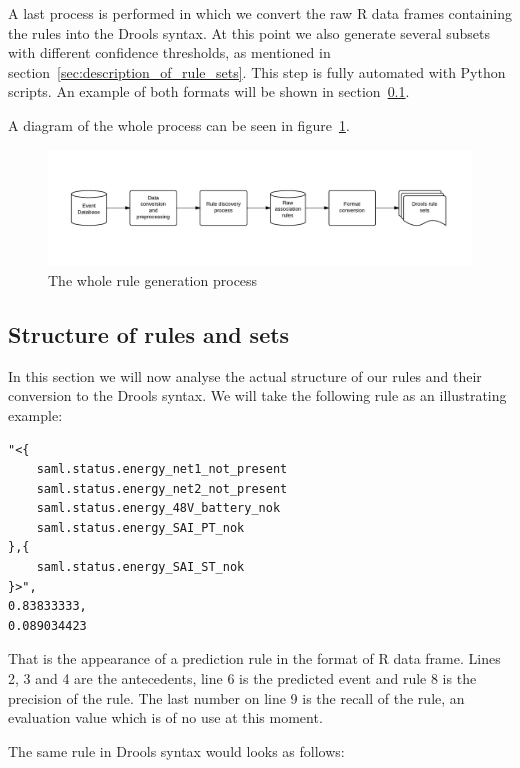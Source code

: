 A last process is performed in which we convert the raw R data frames\cite{ihaka1996r} containing the rules into the Drools syntax. At this point we also generate several subsets with different confidence thresholds, as mentioned in section~\ref{sec:description_of_rule_sets}. This step is fully automated with Python\cite{sanner1999python} scripts. An example of both formats will be shown in section~\ref{sec:structure_of_rules_and_sets}.

A diagram of the whole process can be seen in figure~\ref{fig:prototypeGenProcess}.

\begin{figure}[hbtp]
\includegraphics[width=\textwidth]{img/prototypeGenProcess.pdf}
\caption{The whole rule generation process} \label{fig:prototypeGenProcess}
\end{figure}

\subsection{Structure of rules and sets}
\label{sec:structure_of_rules_and_sets}
In this section we will now analyse the actual structure of our rules and their conversion to the Drools syntax. We will take the following rule as an illustrating example:

\begin{framed}
\begin{lstlisting}[style=mono]
"<{
	saml.status.energy_net1_not_present
	saml.status.energy_net2_not_present
	saml.status.energy_48V_battery_nok
	saml.status.energy_SAI_PT_nok
},{
	saml.status.energy_SAI_ST_nok
}>",
0.83833333,
0.089034423
\end{lstlisting}
\end{framed}

That is the appearance of a prediction rule in the format of R data frame. Lines 2, 3 and 4 are the antecedents, line 6 is the predicted event and rule 8 is the precision of the rule. The last number on line 9 is the recall of the rule, an evaluation value which is of no use at this moment.

The same rule in Drools syntax would looks as follows:

